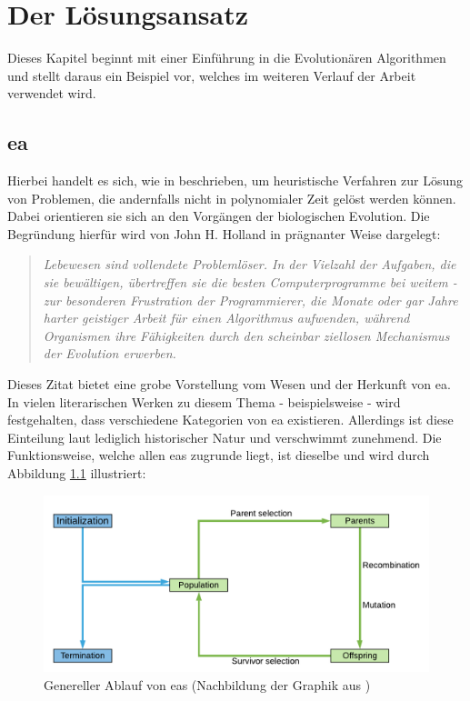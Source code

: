 \chapter{Der Lösungsansatz}
\label{sec:ex}

	Dieses Kapitel beginnt mit einer Einführung in die Evolutionären Algorithmen und stellt daraus ein Beispiel vor, welches im weiteren Verlauf der Arbeit verwendet wird.

	\section{\gls{ea}}
	\label{sec:evol}
	
	Hierbei handelt es sich, wie in \cite{ea-intro} beschrieben, um heuristische Verfahren zur Lösung von Problemen, die andernfalls nicht in polynomialer Zeit gelöst werden können. Dabei orientieren sie sich an den Vorgängen der biologischen Evolution. Die Begründung hierfür wird von John H. Holland \cite{j-h-holland} in prägnanter Weise dargelegt: 
	
	\begin{quote}
		\textit{Lebewesen sind vollendete Problemlöser. In der Vielzahl der Aufgaben, die sie bewältigen, übertreffen sie die besten Computerprogramme bei weitem - zur besonderen Frustration der Programmierer, die Monate oder gar Jahre harter geistiger Arbeit für einen Algorithmus aufwenden, während Organismen ihre Fähigkeiten durch den scheinbar ziellosen Mechanismus der Evolution erwerben.}
	\end{quote}
	
	Dieses Zitat bietet eine grobe Vorstellung vom Wesen und der Herkunft von \gls{ea}. In vielen literarischen Werken zu diesem Thema - beispielsweise \cite{ger-kla-kru-intro, eib-smi-ea} - wird festgehalten, dass verschiedene Kategorien von \gls{ea} existieren. Allerdings ist diese Einteilung laut \cite{eib-smi-ea} lediglich historischer Natur und verschwimmt zunehmend. Die Funktionsweise, welche allen \gls{ea}s zugrunde liegt, ist dieselbe und wird durch Abbildung \ref{fig:ea-flowchart} illustriert: 
	
	\begin{figure}[h]
		\centering
		\includegraphics[width=0.9\linewidth]{ea_flowchart}
		\caption[Genereller Ablauf von \gls{ea}s]{Genereller Ablauf von \gls{ea}s (Nachbildung der Graphik aus \cite[Seite 27]{eib-smi-ea})}
		\label{fig:ea-flowchart}
	\end{figure}

